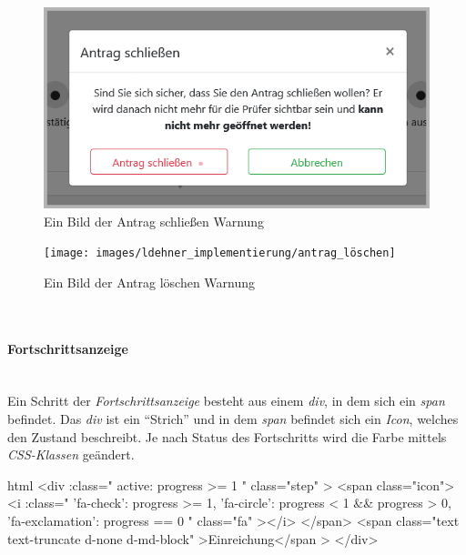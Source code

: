 \begin{figure}[H]
	\centering
	\includegraphics[width=0.6\linewidth]{images/ldehner_implementierung/antrag_schliessen}
	\caption[Antrag schließen Warnung]{Ein Bild der Antrag schließen Warnung}
	\label{fig:antragschliessen}
\end{figure}
\begin{figure}[H]
	\centering
	\texttt{[image: images/ldehner\_implementierung/antrag\_löschen]}
	\caption[Antrag löschen Warnung]{Ein Bild der Antrag löschen Warnung}
	\label{fig:antragloeschen}
\end{figure}


~\\
\paragraph{Fortschrittsanzeige}
~\\
Ein Schritt der \textit{Fortschrittsanzeige} besteht aus einem \textit{div}, in dem sich ein \textit{span} befindet. Das \textit{div} ist ein \enquote{Strich} und in dem \textit{span} befindet sich ein \textit{Icon}, welches den Zustand beschreibt. Je nach Status des Fortschritts wird die Farbe mittels \textit{CSS-Klassen} geändert.
\begin{code}{html}
	<div
            :class="{
              active: progress >= 1
            }"
            class="step"
          >
            <span class="icon">
              <i
                :class="{
                  'fa-check': progress >= 1,
                  'fa-circle': progress < 1 && progress > 0,
                  'fa-exclamation': progress == 0
                }"
                class="fa"
              ></i>
            </span>
            <span class="text text-truncate d-none d-md-block"
              >Einreichung</span
            >
          </div>
\end{code}
	\label{list:codeprogress} ~\\

	\label{list:progresscolor} ~\\

